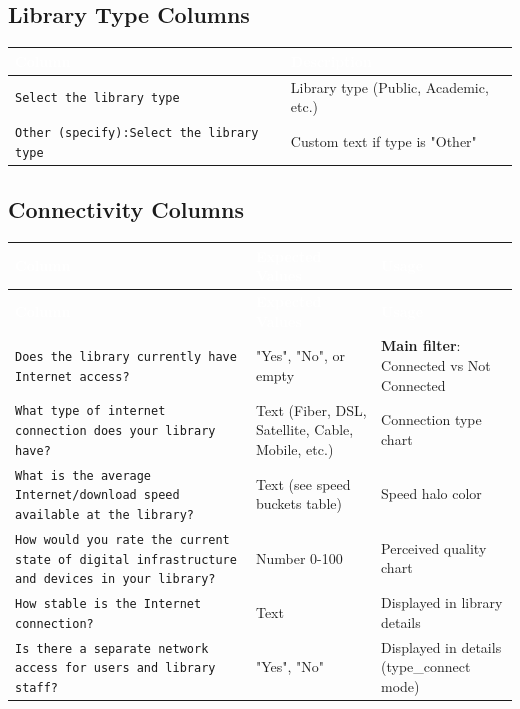 \documentclass[11pt,a4paper]{article}
\begin{document}
\subsection{Library Type Columns}

\begin{longtable}{|p{7cm}|p{7cm}|}
\hline
\rowcolor{headerblue}\textcolor{white}{\textbf{Column}} & \textcolor{white}{\textbf{Description}} \\
\hline
\texttt{Select the library type} & Library type (Public, Academic, etc.) \\
\hline
\texttt{Other (specify):Select the library type} & Custom text if type is "Other" \\
\hline
\end{longtable}

\subsection{Connectivity Columns}

\begin{longtable}{|p{5.5cm}|p{3.5cm}|p{4.5cm}|}
\hline
\rowcolor{headerblue}\textcolor{white}{\textbf{Column}} & \textcolor{white}{\textbf{Expected Values}} & \textcolor{white}{\textbf{Usage}} \\
\hline
\endfirsthead
\hline
\rowcolor{headerblue}\textcolor{white}{\textbf{Column}} & \textcolor{white}{\textbf{Expected Values}} & \textcolor{white}{\textbf{Usage}} \\
\hline
\endhead
\texttt{Does the library currently have Internet access?} & "Yes", "No", or empty & \textbf{Main filter}: Connected vs Not Connected \\
\hline
\texttt{What type of internet connection does your library have?} & Text (Fiber, DSL, Satellite, Cable, Mobile, etc.) & Connection type chart \\
\hline
\texttt{What is the average Internet/download speed available at the library?} & Text (see speed buckets table) & Speed halo color \\
\hline
\texttt{How would you rate the current state of digital infrastructure and devices in your library?} & Number 0-100 & Perceived quality chart \\
\hline
\texttt{How stable is the Internet connection?} & Text & Displayed in library details \\
\hline
\texttt{Is there a separate network access for users and library staff?} & "Yes", "No" & Displayed in details (type\_connect mode) \\
\hline
\end{longtable}
\end{document}
